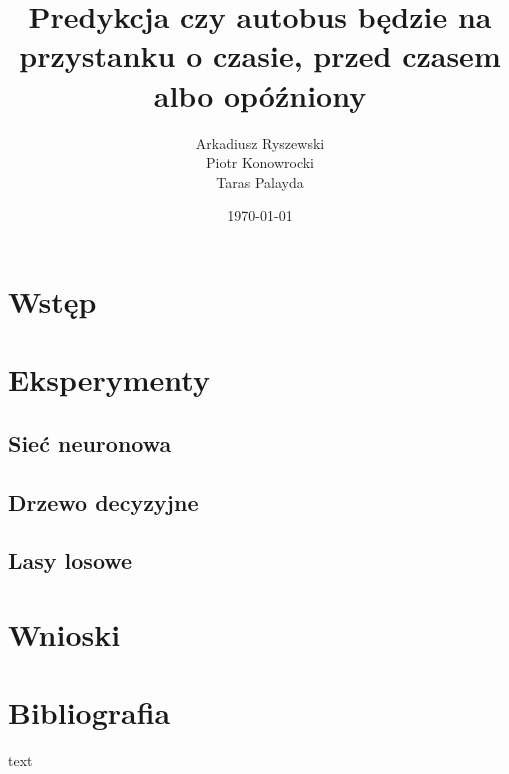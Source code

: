 \documentclass[12pt]{article}
\begin{document}
	\title{Predykcja czy autobus będzie na przystanku o czasie, przed czasem albo opóźniony}
	\date{\today}
	\author{Arkadiusz Ryszewski \\ Piotr Konowrocki \\ Taras Palayda}
	\maketitle
	\tableofcontents

	\section{Wstęp}
	\section{Eksperymenty}
		\subsection{Sieć neuronowa}
		\subsection{Drzewo decyzyjne}
		\subsection{Lasy losowe}
	\section{Wnioski}

	\section{Bibliografia}
		\begin{enumerate}[label={[\arabic*]}]
			\item text
		\end{enumerate}
\end{document}
